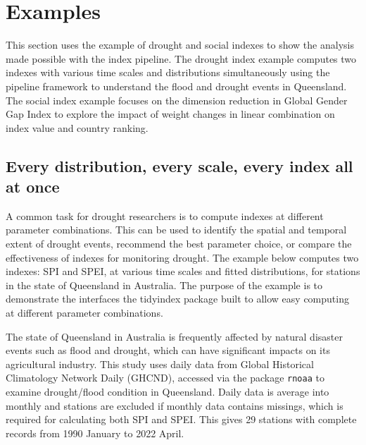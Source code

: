 \documentclass[
]{interact}
\begin{document}
\hypertarget{sec-examples}{%
\section{Examples}\label{sec-examples}}

This section uses the example of drought and social indexes to show the
analysis made possible with the index pipeline. The drought index
example computes two indexes with various time scales and distributions
simultaneously using the pipeline framework to understand the flood and
drought events in Queensland. The social index example focuses on the
dimension reduction in Global Gender Gap Index to explore the impact of
weight changes in linear combination on index value and country ranking.

\hypertarget{every-distribution-every-scale-every-index-all-at-once}{%
\subsection{Every distribution, every scale, every index all at
once}\label{every-distribution-every-scale-every-index-all-at-once}}

A common task for drought researchers is to compute indexes at different
parameter combinations. This can be used to identify the spatial and
temporal extent of drought events, recommend the best parameter choice,
or compare the effectiveness of indexes for monitoring drought. The
example below computes two indexes: SPI and SPEI, at various time scales
and fitted distributions, for stations in the state of Queensland in
Australia. The purpose of the example is to demonstrate the interfaces
the tidyindex package built to allow easy computing at different
parameter combinations.

The state of Queensland in Australia is frequently affected by natural
disaster events such as flood and drought, which can have significant
impacts on its agricultural industry. This study uses daily data from
Global Historical Climatology Network Daily (GHCND), accessed via the
package \texttt{rnoaa} to examine drought/flood condition in Queensland.
Daily data is average into monthly and stations are excluded if monthly
data contains missings, which is required for calculating both SPI and
SPEI. This gives 29 stations with complete records from 1990 January to
2022 April.
\end{document}
